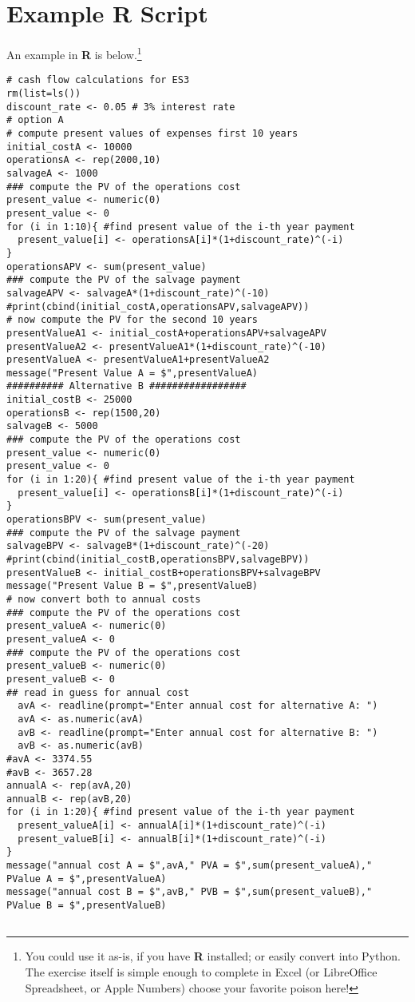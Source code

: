 \documentclass[12pt]{article}
\begin{document}
\section*{\small{Example R Script}}
An example in \textbf{R} is below.\footnote{You could use it as-is, if you have \textbf{R} installed; or easily convert into Python.  The exercise itself is simple enough to complete in Excel (or LibreOffice Spreadsheet, or Apple Numbers) choose your favorite poison here!}
\begin{verbatim}
# cash flow calculations for ES3
rm(list=ls())
discount_rate <- 0.05 # 3% interest rate
# option A
# compute present values of expenses first 10 years
initial_costA <- 10000
operationsA <- rep(2000,10)
salvageA <- 1000
### compute the PV of the operations cost
present_value <- numeric(0)
present_value <- 0
for (i in 1:10){ #find present value of the i-th year payment
  present_value[i] <- operationsA[i]*(1+discount_rate)^(-i)
}
operationsAPV <- sum(present_value)
### compute the PV of the salvage payment
salvageAPV <- salvageA*(1+discount_rate)^(-10)
#print(cbind(initial_costA,operationsAPV,salvageAPV))
# now compute the PV for the second 10 years
presentValueA1 <- initial_costA+operationsAPV+salvageAPV
presentValueA2 <- presentValueA1*(1+discount_rate)^(-10)
presentValueA <- presentValueA1+presentValueA2
message("Present Value A = $",presentValueA)
########## Alternative B #################
initial_costB <- 25000
operationsB <- rep(1500,20)
salvageB <- 5000
### compute the PV of the operations cost
present_value <- numeric(0)
present_value <- 0
for (i in 1:20){ #find present value of the i-th year payment
  present_value[i] <- operationsB[i]*(1+discount_rate)^(-i)
}
operationsBPV <- sum(present_value)
### compute the PV of the salvage payment
salvageBPV <- salvageB*(1+discount_rate)^(-20)
#print(cbind(initial_costB,operationsBPV,salvageBPV))
presentValueB <- initial_costB+operationsBPV+salvageBPV
message("Present Value B = $",presentValueB)
# now convert both to annual costs
### compute the PV of the operations cost
present_valueA <- numeric(0)
present_valueA <- 0
### compute the PV of the operations cost
present_valueB <- numeric(0)
present_valueB <- 0
## read in guess for annual cost
  avA <- readline(prompt="Enter annual cost for alternative A: ")
  avA <- as.numeric(avA)
  avB <- readline(prompt="Enter annual cost for alternative B: ")
  avB <- as.numeric(avB)
#avA <- 3374.55
#avB <- 3657.28
annualA <- rep(avA,20)
annualB <- rep(avB,20)
for (i in 1:20){ #find present value of the i-th year payment
  present_valueA[i] <- annualA[i]*(1+discount_rate)^(-i)
  present_valueB[i] <- annualB[i]*(1+discount_rate)^(-i)
}
message("annual cost A = $",avA," PVA = $",sum(present_valueA)," PValue A = $",presentValueA)
message("annual cost B = $",avB," PVB = $",sum(present_valueB)," PValue B = $",presentValueB)


\end{verbatim}
\end{document}

